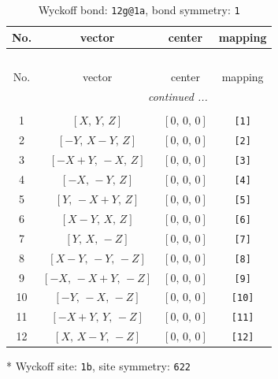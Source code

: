 \documentclass[fleqn,8pt]{jsarticle}
\begin{document}
\begin{longtable}{cccc}
\caption{Wyckoff bond: {\tt 12g@1a}, bond symmetry: {\tt 1}}
 \\
 \hline \hline
No. & vector & center & mapping \\ \hline \endfirsthead

\multicolumn{3}{l}{\tablename\ \thetable{}} \\
 \hline \hline
No. & vector & center & mapping \\ \hline \endhead

 \hline \hline
\multicolumn{3}{r}{\footnotesize\it continued ...} \\ \endfoot

 \hline \hline
\multicolumn{3}{r}{} \\ \endlastfoot

1 & $\left[ X,\, Y,\, Z \right]$ & $\left[ 0,\, 0,\, 0 \right]$ & {\tt [1]} \\ \hline
2 & $\left[ - Y,\, X - Y,\, Z \right]$ & $\left[ 0,\, 0,\, 0 \right]$ & {\tt [2]} \\ \hline
3 & $\left[ - X + Y,\, - X,\, Z \right]$ & $\left[ 0,\, 0,\, 0 \right]$ & {\tt [3]} \\ \hline
4 & $\left[ - X,\, - Y,\, Z \right]$ & $\left[ 0,\, 0,\, 0 \right]$ & {\tt [4]} \\ \hline
5 & $\left[ Y,\, - X + Y,\, Z \right]$ & $\left[ 0,\, 0,\, 0 \right]$ & {\tt [5]} \\ \hline
6 & $\left[ X - Y,\, X,\, Z \right]$ & $\left[ 0,\, 0,\, 0 \right]$ & {\tt [6]} \\ \hline
7 & $\left[ Y,\, X,\, - Z \right]$ & $\left[ 0,\, 0,\, 0 \right]$ & {\tt [7]} \\ \hline
8 & $\left[ X - Y,\, - Y,\, - Z \right]$ & $\left[ 0,\, 0,\, 0 \right]$ & {\tt [8]} \\ \hline
9 & $\left[ - X,\, - X + Y,\, - Z \right]$ & $\left[ 0,\, 0,\, 0 \right]$ & {\tt [9]} \\ \hline
10 & $\left[ - Y,\, - X,\, - Z \right]$ & $\left[ 0,\, 0,\, 0 \right]$ & {\tt [10]} \\ \hline
11 & $\left[ - X + Y,\, Y,\, - Z \right]$ & $\left[ 0,\, 0,\, 0 \right]$ & {\tt [11]} \\ \hline
12 & $\left[ X,\, X - Y,\, - Z \right]$ & $\left[ 0,\, 0,\, 0 \right]$ & {\tt [12]} \\
\end{longtable}
* Wyckoff site: {\tt 1b}, site symmetry: {\tt 622}
\renewcommand{\arraystretch}{1.2}
\end{document}
